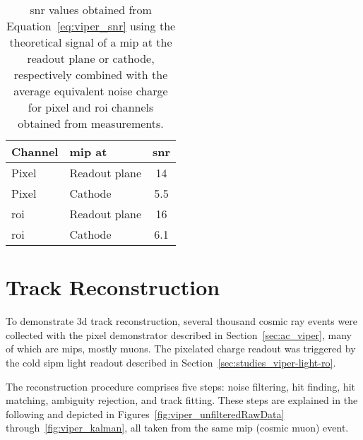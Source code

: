\begin{table}[htb]
	\centering
	\caption[Pixel demonstrator ]{%
		\acrshort{snr} values obtained from Equation~\eqref{eq:viper_snr} using the theoretical signal of a \acrshort{mip} at the readout plane or cathode, respectively combined with the average equivalent noise charge for pixel and \acrshort{roi} channels obtained from measurements.
	}
	\label{tab:viper_snr}
	\begin{tabu} to \textwidth {llS}
		\toprule
		Channel &			\acrshort{mip} at &	{\acrshort{snr}} \\
		\midrule
		Pixel &				Readout plane &		14 \\
		Pixel &				Cathode &			5.5 \\
		\acrshort{roi} &	Readout plane &		16 \\
		\acrshort{roi} &	Cathode &			6.1 \\
		\bottomrule
	\end{tabu}
\end{table}


\section{ Track Reconstruction}
\label{sec:ac_reco}

To demonstrate \gls{3d} track reconstruction, several thousand cosmic ray events were collected with the \AC{} pixel demonstrator described in Section~\ref{sec:ac_viper}, many of which are \glspl{mip}, mostly muons.
The pixelated charge readout was triggered by the cold \gls{sipm} light readout described in Section~\ref{sec:studies_viper-light-ro}.

The reconstruction procedure comprises five steps: noise filtering, hit finding, hit matching, ambiguity rejection, and track fitting.
These steps are explained in the following and depicted in Figures~\ref{fig:viper_unfilteredRawData} through~\ref{fig:viper_kalman}, all taken from the same \gls{mip} (cosmic muon) event.

